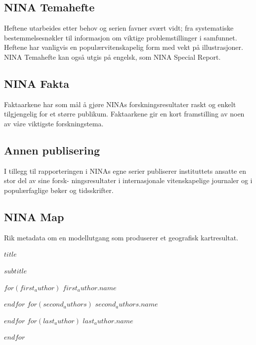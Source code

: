 \documentclass[11pt, a4paper]{article}
\begin{document}
\subsection*{\small{NINA Temahefte}}
{\normalsize Heftene utarbeides etter behov og serien favner svært vidt; fra systematiske bestemmelsesnøkler til informasjon om viktige problemstillinger i samfunnet. Heftene har vanligvis en populærvitenskapelig form med vekt på illustrasjoner. NINA Temahefte kan også utgis på engelsk, som NINA Special Report.}

\subsection*{\small{NINA Fakta}}
{\normalsize Faktaarkene har som mål å gjøre NINAs forskningsresultater raskt og enkelt tilgjengelig for et større
publikum. Faktaarkene gir en kort framstilling av noen av våre viktigste forskningstema.}

\subsection*{\small{Annen publisering}}
{\normalsize I tillegg til rapporteringen i NINAs egne serier publiserer instituttets ansatte en stor del av sine forsk- ningsresultater i internasjonale vitenskapelige journaler og i populærfaglige bøker og tidsskrifter.}

\subsection*{\small{NINA Map}}
{\normalsize Rik metadata om en modellutgang som produserer et geografisk kartresultat.}
\clearpage
{}
\setcounter{page}{1}
\vspace{2cm}

\huge{$title$} \par\vspace{.5cm}
\LARGE{$subtitle$} \par\vspace{1cm}
$for(first_author)$
\hspace{0cm}\LARGE{$first_author.name$} \par
$endfor$
$for(second_authors)$
\LARGE{$second_authors.name$} \par
$endfor$
$for(last_author)$
\LARGE{$last_author.name$} \par
$endfor$
\end{document}
